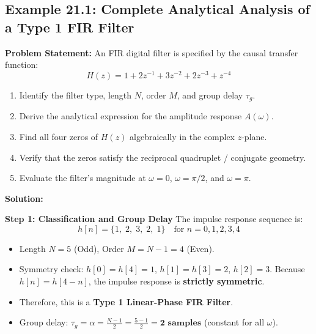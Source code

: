 \documentclass[11pt,a4paper]{article}
\begin{document}
\subsection{Example 21.1: Complete Analytical Analysis of a Type 1 FIR Filter}
\textbf{Problem Statement:} An FIR digital filter is specified by the causal transfer function:
\begin{equation}
H(z) = 1 + 2z^{-1} + 3z^{-2} + 2z^{-3} + z^{-4}
\end{equation}
\begin{enumerate}
    \item Identify the filter type, length $N$, order $M$, and group delay $\tau_g$.
    \item Derive the analytical expression for the amplitude response $A(\omega)$.
    \item Find all four zeros of $H(z)$ algebraically in the complex $z$-plane.
    \item Verify that the zeros satisfy the reciprocal quadruplet / conjugate geometry.
    \item Evaluate the filter's magnitude at $\omega = 0$, $\omega = \pi/2$, and $\omega = \pi$.
\end{enumerate}

\vspace{1mm}
\noindent\textbf{Solution:}

\noindent\textbf{Step 1: Classification and Group Delay}
The impulse response sequence is:
\begin{equation}
h[n] = \{1, \; 2, \; 3, \; 2, \; 1\} \quad \text{for } n = 0, 1, 2, 3, 4
\end{equation}
\begin{itemize}
    \item Length $N = 5$ (Odd), Order $M = N - 1 = 4$ (Even).
    \item Symmetry check: $h[0] = h[4] = 1$, $h[1] = h[3] = 2$, $h[2] = 3$. Because $h[n] = h[4-n]$, the impulse response is \textbf{strictly symmetric}.
    \item Therefore, this is a \textbf{Type 1 Linear-Phase FIR Filter}.
    \item Group delay: $\tau_g = \alpha = \frac{N-1}{2} = \frac{5-1}{2} = \mathbf{2 \text{ samples}}$ (constant for all $\omega$).
\end{itemize}
\end{document}
